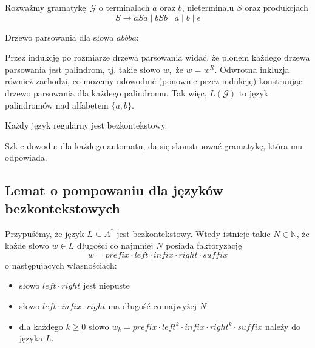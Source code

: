 \begin{example}
    Rozważmy gramatykę $\mathcal{G}$  o terminalach $a$ oraz $b$, nieterminalu $S$ oraz produkcjach
    $$S \to aSa \; | \; bSb \; | \; a \; | \; b \; | \; \epsilon$$

    Drzewo parsowania dla słowa $abbba$:
    \begin{center}
    \end{center}
    
    Przez indukcję po rozmiarze drzewa parsowania widać, że plonem każdego drzewa parsowania jest palindrom, tj. takie słowo $w$, że $w = w^R$. Odwrotna inkluzja również zachodzi, co możemy udowodnić (ponownie przez indukcję) konstruując drzewo parsowania dla każdego palindromu. Tak więc, $L(\mathcal{G})$ to język palindromów nad alfabetem $\{a, b\}$.
\end{example}

\begin{lemma}
    Każdy język regularny jest bezkontekstowy.
\end{lemma}
Szkic dowodu: dla każdego automatu, da się skonstruować gramatykę, która mu odpowiada.

\subsection{Lemat o pompowaniu dla języków bezkontekstowych}
\begin{lemma} 
    Przypuśćmy, że język $L \subseteq A^*$ jest bezkontekstowy.
    Wtedy istnieje takie $N \in \mathbb{N}$, że każde
    słowo $w \in L$ długości co najmniej $N$ posiada 
    faktoryzację
    $$w = prefix \cdot left \cdot infix \cdot right \cdot suffix$$
    o następujących własnościach:
    \begin{itemize}
        \item słowo $left \cdot right$ jest niepuste
        \item słowo $left \cdot infix \cdot right$
        ma długość co najwyżej $N$
        \item dla każdego $k \geq 0$ słowo
        $w_k = prefix \cdot left^k \cdot infix \cdot right^k \cdot suffix$ należy do języka $L$.
    \end{itemize}
\end{lemma}

